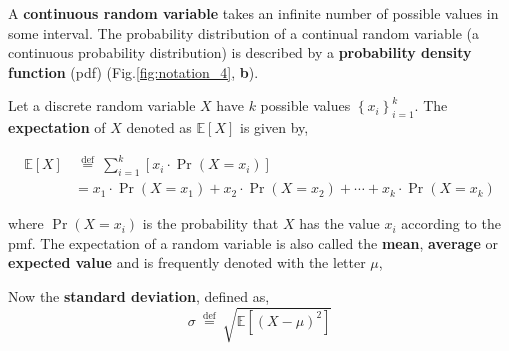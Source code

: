 A \textbf{continuous random variable} takes an infinite number of possible values in some interval. The probability distribution of a continual random variable (a continuous probability distribution) is described by a \textbf{probability density function} (pdf) (Fig.\ref{fig:notation_4}, \textbf{b}).

Let a discrete random variable \(X\) have \(k\) possible values \(\left\{x_{i}\right\}_{i=1}^{k}\). The \textbf{expectation} of \(X\) denoted as \(\mathbb{E}[X]\) is given by,

$$
	\begin{aligned} \mathbb{E}[X] & \stackrel{\text { def }}{=} \sum_{i=1}^{k}\left[x_{i} \cdot \operatorname{Pr}\left(X=x_{i}\right)\right] \\ & =x_{1} \cdot \operatorname{Pr}\left(X=x_{1}\right)+x_{2} \cdot \operatorname{Pr}\left(X=x_{2}\right)+\cdots+x_{k} \cdot \operatorname{Pr}\left(X=x_{k}\right)\end{aligned}
$$

where \(\operatorname{Pr}\left(X=x_{i}\right)\) is the probability that \(X\) has the value \(x_{i}\) according to the pmf. The expectation of a random variable is also called the \textbf{mean}, \textbf{average} or \textbf{expected value} and is frequently denoted with the letter \(\mu\),

Now the \textbf{standard deviation}, defined as,
$$
	\sigma \stackrel{\text { def }}{=} \sqrt{\mathbb{E}\left[(X-\mu)^{2}\right]}
$$

